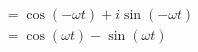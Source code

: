\documentclass[preview]{standalone}
\begin{document}
\begin{align*}
\begin{aligned}=\cos{(-\omega t)}+i\sin{(-\omega t)} \\ = \cos{(\omega t)}-\sin{(\omega t)}\end{aligned}
\end{align*}
\end{document}

